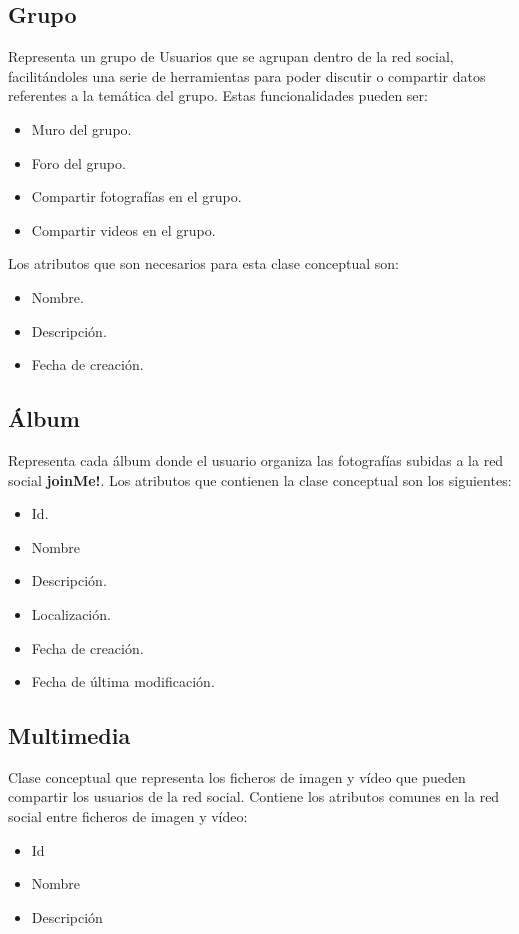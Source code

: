 \documentclass[12pt, a4paper, titlepage]{article}
\begin{document}
\subsection{Grupo}
	Representa un grupo de Usuarios que se agrupan dentro de la red social, facilitándoles una serie de herramientas para poder discutir o compartir datos referentes a la temática del grupo. Estas funcionalidades pueden ser:
	\begin{itemize}
		\item Muro del grupo.
		\item Foro del grupo.
		\item Compartir fotografías en el grupo.
		\item Compartir videos en el grupo.
	\end{itemize}
	Los atributos que son necesarios para esta clase conceptual son:
	\begin{itemize}
		\item Nombre.
		\item Descripción.
		\item Fecha de creación.
	\end{itemize}
\subsection{Álbum}
	Representa cada álbum donde el usuario organiza las fotografías subidas a la red social \textbf{joinMe!}. Los atributos que contienen la clase conceptual son los siguientes:
	\begin{itemize}
		\item Id.
		\item Nombre
		\item Descripción.
		\item Localización.
		\item Fecha de creación.
		\item Fecha de última modificación.
	\end{itemize}
\subsection{Multimedia}
	Clase conceptual que representa los ficheros de imagen y vídeo que pueden compartir los usuarios de la red social. Contiene los atributos comunes en la red social entre ficheros de imagen y vídeo:
	\begin{itemize}
		\item Id
		\item Nombre
		\item Descripción
	\end{itemize}
\end{document}

